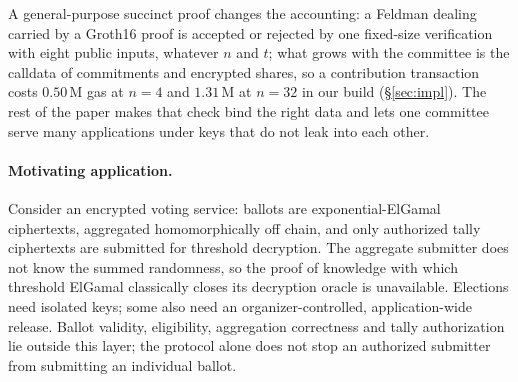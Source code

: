 A general-purpose succinct proof changes the accounting: a Feldman dealing carried by a Groth16 proof is accepted or rejected by one fixed-size verification with eight public inputs, whatever $n$ and $t$; what grows with the committee is the calldata of commitments and encrypted shares, so a contribution transaction costs $0.50$\,M gas at $n = 4$ and $1.31$\,M at $n = 32$ in our build (\S\ref{sec:impl}). The rest of the paper makes that check bind the right data and lets one committee serve many applications under keys that do not leak into each other.

\paragraph{Motivating application.} Consider an encrypted voting service: ballots are exponential-ElGamal ciphertexts, aggregated homomorphically off chain, and only authorized tally ciphertexts are submitted for threshold decryption. The aggregate submitter does not know the summed randomness, so the proof of knowledge with which threshold ElGamal classically closes its decryption oracle \cite{shoup2002threshold} is unavailable. Elections need isolated keys; some also need an organizer-controlled, application-wide release. Ballot validity, eligibility, aggregation correctness and tally authorization lie outside this layer; the protocol alone does not stop an authorized submitter from submitting an individual ballot.

